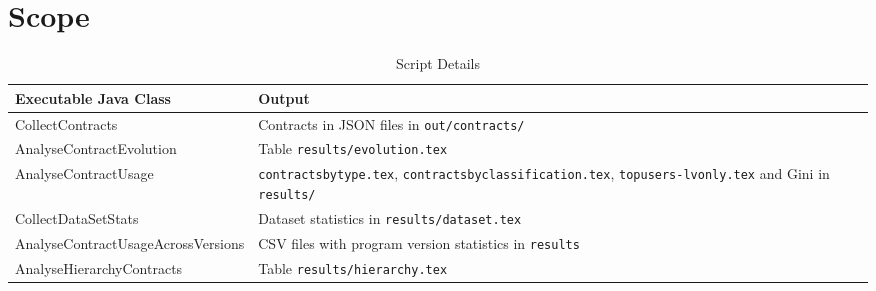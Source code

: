 \documentclass[a4paper,UKenglish]{darts}
\newenvironment{scope}{\section{Scope}}{}
\begin{document}
\begin{scope}
  
  \begin{table}[t]
  	\centering
  	\caption{Script Details}
  	\label{tab:scripts}
  	\begin{tabular}{p{6cm} p{8cm} } \hline
  		Executable Java Class & Output \\ \hline
  		CollectContracts & Contracts in JSON files in \texttt{out/contracts/}   \\
  		AnalyseContractEvolution & Table \texttt{results/evolution.tex}	 \\
  		AnalyseContractUsage & \texttt{contractsbytype.tex}, \texttt{contractsbyclassification.tex}, \texttt{topusers-lvonly.tex} and Gini in \texttt{results/} \\
  		CollectDataSetStats & Dataset statistics in \texttt{results/dataset.tex}   \\
  		AnalyseContractUsageAcrossVersions & CSV files with program version statistics in \texttt{results} \\
  		AnalyseHierarchyContracts & Table \texttt{results/hierarchy.tex} \\
  		\hline
  	\end{tabular}
  \end{table}
  
  
  


   	
\end{scope}
\end{document}
